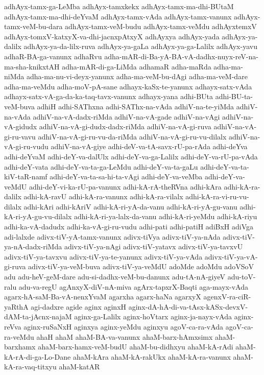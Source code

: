 {adhAyx-tamx-ga-LeMba
adhAyx-tamxkekx
adhAyx-tamx-ma-dhi-BUtaM
adhAyx-tamx-ma-dhi-deYvaM
adhAyx-tamx-vAda
adhAyx-tamx-vanunx
adhAyx-tamx-veM-bu-dara
adhAyx-tamx-veM-budu
adhAyx-tamx-veMdu
adhAyxtemxV
adhAyx-tomxV-katxyX-va-dhi-jacnxpAtxyX
adhAyxya
adhAyx-yada
adhAyx-ya-dalilx
adhAyx-ya-da-lilx-ruva
adhAyx-ya-gaLa
adhAyx-ya-ga-Lalilx
adhAyx-yavu
adhaR-BA-ga-vanunx
adhaRvu
adha-mAR-di-Ba-yA-BA-vA-dadhx-nuyx-reV-na-ma-sha-knikxtAH
adha-mAR-di-ga-LiMda
adhamaR
adha-maRda
adha-ma-niMda
adha-ma-nu-vi-deyx-yanunx
adha-ma-veM-bu-dAgi
adha-ma-veM-dare
adha-ma-veMdu
adha-moV-pA-sane
adhayx-kaSx-te-yanunx
adhayx-satx-vAda
adhayx-satx-vA-ga-da-ka-taq-tavx-vanunx
adhayx-yana
adhi-BUta
adhi-BU-ta-veM-buva
adhiH
adhi-SAThxna
adhi-SAThx-na-vAda
adhiV-na-te-yiMda
adhiV-na-vAda
adhiV-na-vA-dadx-riMda
adhiV-na-vA-gade
adhiV-na-vAgi
adhiV-na-vA-gidudx
adhiV-na-vA-gi-dudx-dadx-riMda
adhiV-na-vA-gi-ruva
adhiV-na-vA-gi-ru-vavu
adhiV-na-vA-gi-ru-vu-da-riMda
adhiV-na-vA-gi-ru-vu-dilalx
adhiV-na-vA-gi-ru-vudu
adhiV-na-vA-giye
adhi-deV-va-tA-savx-rU-pa-rAda
adhi-deYva
adhi-deYvaM
adhi-deY-va-dalUlx
adhi-deY-va-ga-Lalilx
adhi-deY-va-rU-pa-vAda
adhi-deY-vata
adhi-deY-va-ta-ga-LeMdu
adhi-deY-va-ta-gaLu
adhi-deY-va-ta-kiV-taR-namf
adhi-deY-va-ta-sa-hi-ta-vAgi
adhi-deY-va-veMba
adhi-deY-va-veMdU
adhi-deY-vi-ka-rU-pa-vanunx
adhi-kA-rA-theRVna
adhi-kAra
adhi-kA-ra-dalilx
adhi-kA-ravU
adhi-kA-ra-vanunx
adhi-kA-ra-vilalx
adhi-kA-ra-vi-ru-vu-dilalx
adhi-kAri
adhi-kAriV
adhi-kA-ri-yA-da-vanu
adhi-kA-ri-yA-gu-vanu
adhi-kA-ri-yA-gu-vu-dilalx
adhi-kA-ri-ya-lalx-da-vanu
adhi-kA-ri-yeMdu
adhi-kA-riyu
adhi-ka-vA-dadudx
adhi-ka-vA-gi-ru-vudu
adhi-pati
adhi-patiH
adiBxH
adiVga
adi-lalxde
adivx-tiV-yA-tamx-vanunx
adivx-tiVya
adivx-tiV-ya-nAda
adivx-tiV-ya-nA-dadx-riMda
adivx-tiV-ya-nAgi
adivx-tiV-yatavx
adivx-tiV-ya-tavxvU
adivx-tiV-ya-tavxvu
adivx-tiV-ya-te-yanunx
adivx-tiV-ya-vAda
adivx-tiV-ya-vA-gi-ruva
adivx-tiV-ya-veM-buva
adivx-tiV-ya-veMdU
adoMde
adoMdu
adoVSoV
adu
adu-heV-geM-dare
adu-si-dadhx-veM-bu-danunx
adu-tA-nA-giyeV
adu-toV-ralu
adu-va-regU
agAnxyX-diV-nA-miva
agArx-tapxrX-Baqti
aga-mayx-vAda
agarx-hA-saM-Ba-vA-nenxYvaM
agarxha
agarx-haNa
agarxyX
agenxV-ra-ciR-yaRthA
agi-dadxre
agide
aginx
aginxH
aginx-dA-hA-di-va-tAsx-kASx-devxV-dAM-ta-jAcnx-najaM
aginx-ga-Lalilx
aginx-hoVtarx
aginx-ja-nayx-vAda
aginx-reVva
aginx-ruSaNxH
aginxya
aginx-yeMdu
aginxyu
agoV-ca-ra-vAda
agoV-ca-ra-veMdu
ahaH
ahaM
ahaM-BA-va-vanunx
ahaM-barx-hAmxsimx
ahaM-barxhamx
ahaM-barx-hamx-veM-budU
ahaM-bu-didhxyu
ahaM-kA-rAdi
ahaM-kA-rA-di-ga-Lo-Dane
ahaM-kAra
ahaM-kA-rakUkx
ahaM-kA-ra-vanunx
ahaM-kA-ra-vaq-titxyu
ahaM-katAR
}
